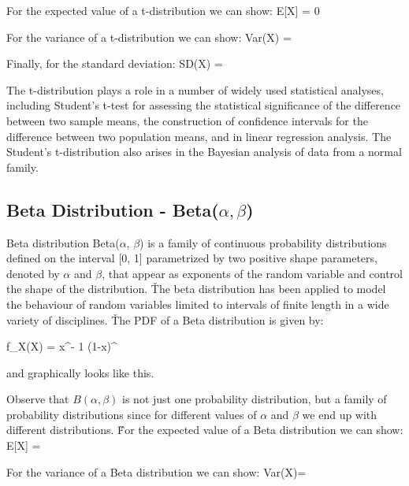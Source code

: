 \vspace{10pt}

For the expected value of a t-distribution we can show:
\bse
E[X] = 0
\ese

For the variance of a t-distribution we can show:
\bse
Var(X) = 
\ese

Finally, for the standard deviation:
\bse
SD(X) = 
\ese

The t-distribution plays a role in a number of widely used statistical analyses, including Student's t-test for
assessing the statistical significance of the difference between two sample means, the construction of confidence
intervals for the difference between two population means, and in linear regression analysis. The Student's
t-distribution also arises in the Bayesian analysis of data from a normal family.

\subsection{Beta Distribution - Beta($\alpha, \beta$)}

Beta distribution Beta($\alpha$, $\beta$) is a family of continuous probability distributions defined on the interval
[0, 1] parametrized by two positive shape parameters, denoted by $\alpha$ and $\beta$, that appear as exponents of
the random variable and control the shape of the distribution. \v

The beta distribution has been applied to model the behaviour of random variables limited to intervals of finite
length in a wide variety of disciplines. \v

The PDF of a Beta distribution is given by:

\bse
f_{X}(X) =  \cdot x^{\alpha - 1} \cdot (1-x)^{}
\ese
\ed

and graphically looks like this.

\vspace{10pt}

Observe that $B(\alpha, \beta)$ is not just one probability distribution, but a family of probability distributions
since for different values of $\alpha$ and $\beta$ we end up with different distributions. \v

For the expected value of a Beta distribution we can show:
\bse
E[X] = \frac{\alpha}{\alpha+\beta}
\ese

For the variance of a Beta distribution we can show:
\bse
Var(X)= 
\ese

